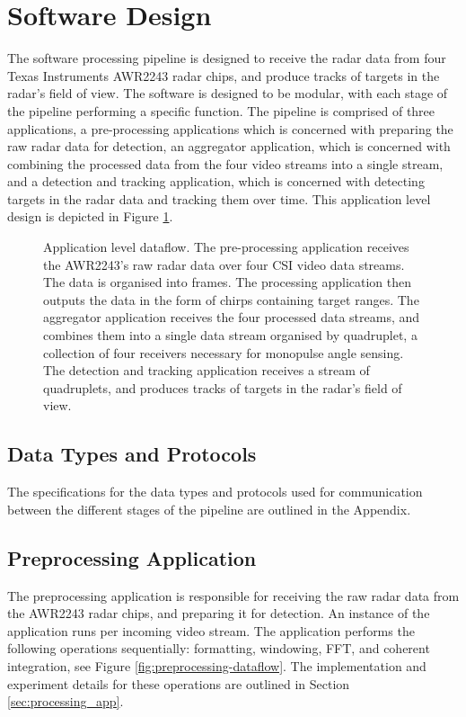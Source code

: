 \section{Software Design}
The software processing pipeline is designed to receive the radar data from four Texas Instruments AWR2243 radar chips, and produce tracks of targets in the radar's field of view. The software is designed to be modular, with each stage of the pipeline performing a specific function. The pipeline is comprised of three applications, a pre-processing applications which is concerned with preparing the raw radar data for detection, an aggregator application, which is concerned with combining the processed data from the four video streams into a single stream, and a detection and tracking application, which is concerned with detecting targets in the radar data and tracking them over time. This application level design is depicted in Figure \ref{fig:application-level-dataflow}. 

\begin{figure}[htbp]
    \centering
    \caption{Application level dataflow. The pre-processing application receives the AWR2243's raw radar data over four CSI video data streams. The data is organised into frames. The processing application then outputs the data in the form of chirps containing target ranges. The aggregator application receives the four processed data streams, and combines them into a single data stream organised by quadruplet, a collection of four receivers necessary for monopulse angle sensing. The detection and tracking application receives a stream of quadruplets, and produces tracks of targets in the radar's field of view.}
    \label{fig:application-level-dataflow}
\end{figure}

\subsection{Data Types and Protocols}
The specifications for the data types and protocols used for communication between the different stages of the pipeline are outlined in the Appendix.


\subsection{Preprocessing Application}
The preprocessing application is responsible for receiving the raw radar data from the AWR2243 radar chips, and preparing it for detection. An instance of the application runs per incoming video stream. The application performs the following operations sequentially: formatting, windowing, FFT, and coherent integration, see Figure \ref{fig:preprocessing-dataflow}. The implementation and experiment details for these operations are outlined in Section \ref{sec:processing_app}. 

